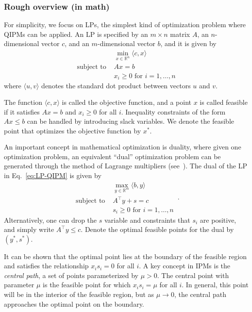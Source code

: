 \begin{refsection}

\subsubsection*{Rough overview (in math)}

For simplicity, we focus on LPs, the simplest kind of optimization problem where QIPMs can be applied. An LP is specified by an $m \times n$ matrix $A$, an $n$-dimensional vector $c$, and an $m$-dimensional vector $b$, and it is given by
\begin{equation}\label{eq:LP-QIPM}
    \begin{split}
        &\min_{x \in \mathbb{R}^n} \langle c, x\rangle \\
        \text{subject to } & Ax=b \\
        & x_i \geq 0 \text{ for } i=1,\ldots,n
    \end{split}
\end{equation}
where $\langle u,v\rangle$ denotes the standard dot product between vectors $u$ and $v$. 

The function $\langle c, x\rangle$ is called the objective function, and a point $x$ is called feasible if it satisfies $Ax=b$ and $x_i \geq 0$ for all $i$. Inequality constraints of the form $Ax \leq b$ can be handled by introducing slack variables. We denote the feasible point that optimizes the objective function by $x^*$.  

An important concept in mathematical optimization is duality, where given one optimization problem, an equivalent ``dual'' optimization problem can be generated through the method of Lagrange multipliers (see~\cite[Section 5]{boyd2004ConvexOptimization}). The dual of the LP in Eq.~\eqref{eq:LP-QIPM} is given by
\begin{equation}\label{eq:dual-LP-QIPM}
    \begin{split}
        &\max_{y \in \mathbb{R}^m} \langle b, y \rangle \\
        \text{subject to } & A^\intercal y + s =c \\
        & s_i \geq 0 \text{ for } i=1,\ldots,n
    \end{split}\,.
\end{equation}
Alternatively, one can drop the $s$ variable and constraints that $s_i$ are positive, and simply write $A^\intercal y \leq c$. Denote 
the optimal feasible points for the dual by $(y^*,s^*)$. 

It can be shown that the optimal point lies at the boundary of the feasible region and satisfies the relationship $x_is_i = 0$ for all $i$. A key concept in IPMs is the \emph{central path}, a set of points parameterized by $\mu > 0$. The central point with parameter $\mu$ is the feasible point for which $x_is_i = \mu$ for all $i$. In general, this point will be in the interior of the feasible region, but as $\mu \rightarrow 0$, the central path approaches the optimal point on the boundary. 


\end{refsection}
